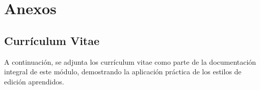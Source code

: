 \documentclass[runningheads]{llncs}
\begin{document}
\section{Anexos}

\subsection{Currículum Vitae}
A continuación, se adjunta los currículum vitae como parte de la documentación integral de este módulo, demostrando la aplicación práctica de los estilos de edición aprendidos.








%
%
%
% 
% 
%
 
\end{document}
